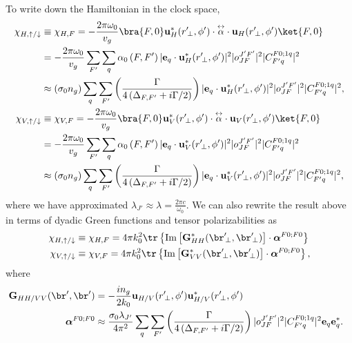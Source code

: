 \documentclass[]{report}
\newcommand{\tensor}[1]{\overset{\leftrightarrow}{#1}} %
\begin{document}
To write down the Hamiltonian in the clock space,
\begin{align}
\chi_{H,\uparrow/\downarrow} & \equiv \chi_{H,F} =- \frac{2\pi \omega_0}{v_g} \bra{F,0} 
	\mathbf{u}^*_H(r^\prime\!_\perp, \phi') \cdot \tensor{\alpha} \cdot 
	\mathbf{u}_{H}(r^\prime\!_\perp, 
	\phi') \ket{F,0} \\
	& =- \frac{2\pi \omega_0}{v_g} \sum_{F'} \sum_q \alpha_0\left( F,F'  \right) |\mathbf{e}_q \cdot 
	\mathbf{u}_H^*(r^\prime\!_\perp,\phi')|^2 |o^{J'F'}_{JF} |^2 
	|C^{F 0;1q}_{F' q}|^2\\
	& \approx  \left( \sigma_0 n_g  \right)  \sum_q \sum_{F'} \left( 
		\frac{\Gamma}{4 
		\left(\Delta_{F,F'}+i\Gamma/2\right) }  \right) |\mathbf{e}_q \cdot 
		\mathbf{u}_H^*(r^\prime\!_\perp,\phi')|^2 |o^{J'F'}_{JF} |^2 
		|C^{F 0;1q}_{F' q}|^2,\label{eq:chiHeu}\\
\chi_{V,\uparrow/\downarrow} & \equiv \chi_{V,F} =- \frac{2\pi \omega_0}{v_g} \bra{F,0} 
	\mathbf{u}^*_V(r^\prime\!_\perp, \phi') \cdot \tensor{\alpha} \cdot 
	\mathbf{u}_{V}(r^\prime\!_\perp, 
	\phi') \ket{F,0} \\
	& =- \frac{2\pi \omega_0}{v_g} \sum_{F'} \sum_q \alpha_0\left( F,F'  \right) |\mathbf{e}_q \cdot 
	\mathbf{u}_V^*(r^\prime\!_\perp,\phi')|^2 |o^{J'F'}_{JF} |^2 
	|C^{F 0;1q}_{F' q}|^2\\
	& \approx   \left( \sigma_0 n_g  \right)  \sum_q\sum_{F'} \left( 
		\frac{\Gamma}{4 
		\left(\Delta_{F,F'}+i\Gamma/2\right) }  \right) |\mathbf{e}_q \cdot 
		\mathbf{u}_V^*(r^\prime\!_\perp,\phi')|^2 |o^{J'F'}_{JF} |^2 
		|C^{F 0;1q}_{F' q}|^2,\label{eq:chiVeu}
\end{align}
where we have approximated $ \lambda_{J'}\approx \lambda = \frac{2\pi c}{\omega_0} $.  We can also 
rewrite the result above in terms of dyadic Green functions and tensor polarizabilities as
\begin{align}
\chi_{H,\uparrow/\downarrow} & \equiv \chi_{H,F} = 4\pi k_0^2 \tr \left\{ \mathrm{Im}\left[ 
\mathbf{G}^*_{HH}(\br^\prime\!_\perp,\br^\prime\!_\perp) \right] \cdot \boldsymbol{\alpha}^{F0;F0} 
\right\}\label{eq:chiHGalpha}\\
\chi_{V,\uparrow/\downarrow} & \equiv \chi_{V,F} = 4\pi k_0^2 \tr \left\{ \mathrm{Im}\left[ 
\mathbf{G}^*_{VV}(\br^\prime\!_\perp,\br^\prime\!_\perp) \right] \cdot \boldsymbol{\alpha}^{F0;F0} 
\right\},\label{eq:chiGalpha}
\end{align}
where 
\begin{align} 
\!\!\!\! \mathbf{G}_{HH/VV}(\br',\br') &= -\frac{in_g}{2k_0} 
\mathbf{u}_{H/V}(r^\prime\!_\perp,\phi')\mathbf{u}_{H/V}^*(r^\prime\!_\perp,\phi')\\
\boldsymbol{\alpha}^{F0;F0} &\approx \frac{\sigma_0\lambda_{J'}}{4\pi^2}  \sum_q \sum_{F'} \left( 
		\frac{\Gamma}{4 
		\left(\Delta_{F,F'}+i\Gamma/2\right) }  \right)   |o^{J'F'}_{JF} |^2 
		|C^{F 0;1q}_{F' q}|^2  \mathbf{e}_q \mathbf{e}_q^*.
\end{align}
 
\end{document}
